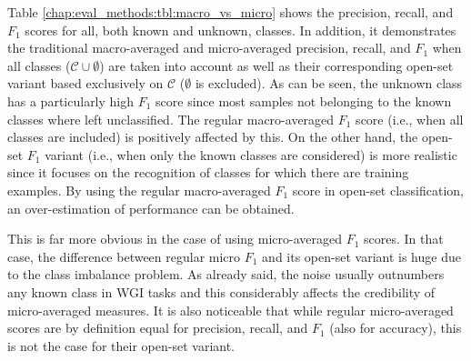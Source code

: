 Table \ref{chap:eval_methods:tbl:macro_vs_micro} shows the precision, recall, and $F_{1}$ scores for all, both known and unknown, classes. In addition, it demonstrates the traditional macro-averaged and micro-averaged precision, recall, and $F_{1}$ when all classes ($\mathcal{C} \cup \emptyset$) are taken into account as well as their corresponding open-set variant based exclusively on $\mathcal{C}$ ($\emptyset$ is excluded). As can be seen, the unknown class has a particularly high $F_1$ score since most samples not belonging to the known classes where left unclassified. The regular macro-averaged $F_1$ score (i.e., when all classes are included) is positively affected by this. On the other hand, the open-set $F_1$ variant (i.e., when only the known classes are considered) is more realistic since it focuses on the recognition of classes for which there are training examples. By using the regular macro-averaged $F_1$ score in open-set classification, an over-estimation of performance can be obtained. 

This is far more obvious in the case of using micro-averaged $F_1$ scores. In that case, the difference between regular micro $F_1$ and its open-set variant is huge due to the class imbalance problem. As already said, the noise usually outnumbers any known class in WGI tasks and this considerably affects the credibility of micro-averaged measures. It is also noticeable that while regular micro-averaged scores are by definition equal for precision, recall, and $F_1$ (also for accuracy), this is not the case for their open-set variant. 

